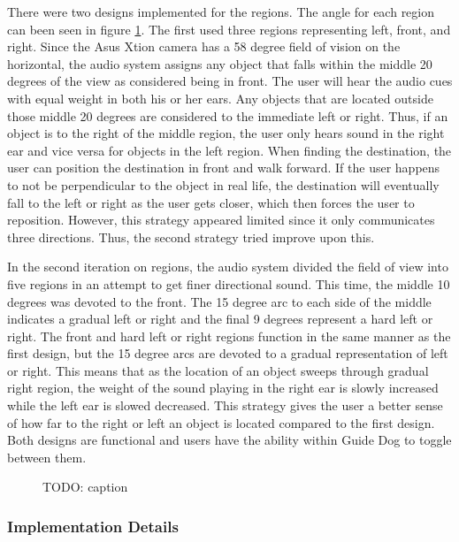 There were two designs implemented for the regions. The angle for each region
can been seen in figure \ref{fig:regions}. The first used three regions
representing left, front, and right. Since the Asus Xtion camera has a 58 degree
field of vision on the horizontal, the audio system assigns any object that
falls within the middle 20 degrees of the view as considered being in front. The
user will hear the audio cues with equal weight in both his or her ears. Any
objects that are located outside those middle 20 degrees are considered to the
immediate left or right. Thus, if an object is to the right of the middle region,
the user only hears sound in the right ear and vice versa for objects in the
left region. When finding the destination, the user can position the destination
in front and walk forward. If the user happens to not be perpendicular to the
object in real life, the destination will eventually fall to the left or right
as the user gets closer, which then forces the user to reposition. However, this
strategy appeared limited since it only communicates three directions. Thus, the
second strategy tried improve upon this.

In the second iteration on regions, the audio system divided the field of view
into five regions in an attempt to get finer directional sound. This time, the
middle 10 degrees was devoted to the front. The 15 degree arc to each side of 
the middle indicates a gradual left or right and the final 9 degrees represent
a hard left or right. The front and hard left or right regions function in the 
same manner as the first design, but the 15 degree arcs are devoted to a gradual
representation of left or right. This means that as the location of an object
sweeps through gradual right region, the weight of the sound playing in the
right ear is slowly increased while the left ear is slowed decreased. This 
strategy gives the user a better sense of how far to the right or left an object
is located compared to the first design. Both designs are functional and users
have the ability within Guide Dog to toggle between them.

\begin{figure}
\caption{TODO: caption}
\label{fig:regions}
\end{figure}

\subsubsection{Implementation Details}
\label{sec:technical-audio-impl}


